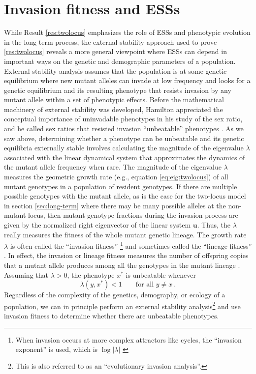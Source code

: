 \documentclass[11pt]{article}
\newcommand{\ess}[1]{#1^*}
\renewcommand{\vec}[1]{\symbf{#1}}
\newcommand{\eig}{\lambda}
\begin{document}
\section{Invasion fitness and ESSs}

While Result \ref{res:twolocus} emphasizes the role of ESSs and phenotypic evolution in the long-term process, the external stability approach used to prove \ref{res:twolocus} reveals a more general viewpoint where ESSs can depend in important ways on the genetic and demographic parameters of a population. External stability analysis assumes that the population is at some genetic equilibrium where new mutant alleles can invade at low frequency and looks for a genetic equilibrium and its resulting phenotype that resists invasion by any mutant allele within a set of phenotypic effects. Before the mathematical machinery of external stability was developed, Hamilton appreciated the conceptual importance of uninvadable phenotypes in his study of the sex ratio, and he called sex ratios that resisted invasion ``unbeatable'' phenotypes \cite{Hamilton:1967}. As we saw above, determining whether a phenotype can be unbeatable and its genetic equilibria externally stable involves calculating the magnitude of the eigenvalue $\eig$ associated with the linear dynamical system that approximates the dynamics of the mutant allele frequency when rare. The magnitude of the eigenvalue $\eig$ measures the geometric growth rate (e.g., equation \eqref{eq:eig:twolocus}) of all mutant genotypes in a population of resident genotypes. If there are multiple possible genotypes with the mutant allele, as is the case for the two-locus model in section \ref{sec:long-term} where there may be many possible alleles at the non-mutant locus, then mutant genotype fractions during the invasion process are given by the normalized right eigenvector of the linear system $\vec{u}$. Thus, the $\eig$ really measures the fitness of the whole mutant genetic lineage. The growth rate $\eig$ is often called the ``invasion fitness'' \cite{Metz:Nisbet:1992,Heino:Metz:1998}\footnote{When invasion occurs at more complex attractors like cycles, the ``invasion exponent'' is used, which is $\log |\eig|$ \cite{Rand:Wilson:1994}} and sometimes called the ``lineage fitness'' \cite{Lehmann:Alger:2015,Akcay:VanCleve:2016,Lehmann:Mullon:2016,Lehmann:Rousset:2020}. In effect, the invasion or lineage fitness measures the number of offspring copies that a mutant allele produces among all the genotypes in the mutant lineage \cite{Lehmann:Mullon:2016}. Assuming that $\eig >0$, the phenotype $\ess{x}$ is unbeatable whenever
\begin{equation}
  \label{eq:unbeatable}
  \eig(y, \ess{x}) < 1 \qquad \text{for all } y \ne x \: .
\end{equation}
Regardless of the complexity of the genetics, demography, or ecology of a population, we can in principle perform an external stability analysis\footnote{This is also referred to as an ``evolutionary invasion analysis''.} and use invasion fitness to determine whether there are unbeatable phenotypes.
\end{document}
